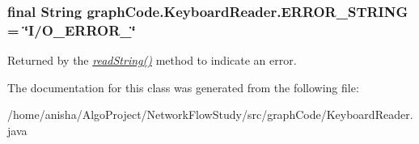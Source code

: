 \subsubsection[{\texorpdfstring{E\+R\+R\+O\+R\+\_\+\+S\+T\+R\+I\+NG}{ERROR_STRING}}]{\setlength{\rightskip}{0pt plus 5cm}final String graph\+Code.\+Keyboard\+Reader.\+E\+R\+R\+O\+R\+\_\+\+S\+T\+R\+I\+NG = \char`\"{}I/O\+\_\+\+E\+R\+R\+O\+R\+\_\char`\"{}\hspace{0.3cm}{\ttfamily [static]}}\hypertarget{classgraphCode_1_1KeyboardReader_a5afecbc3f6ef9e6d54e0513d67b284aa}{}\label{classgraphCode_1_1KeyboardReader_a5afecbc3f6ef9e6d54e0513d67b284aa}
Returned by the {\itshape \hyperlink{classgraphCode_1_1KeyboardReader_a675b8013d5093b880c8988ca4e4dacd8}{read\+String()}} method to indicate an error. 

The documentation for this class was generated from the following file\+:\begin{DoxyCompactItemize}
\item 
/home/anisha/\+Algo\+Project/\+Network\+Flow\+Study/src/graph\+Code/Keyboard\+Reader.\+java\end{DoxyCompactItemize}
